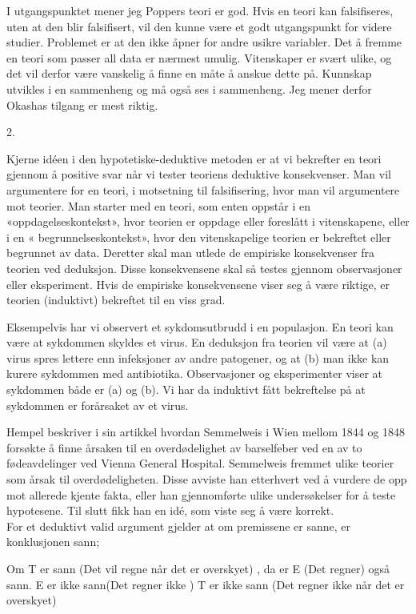 \documentclass[
  letterpaper,
  DIV=11,
  numbers=noendperiod]{scrreprt}
\begin{document}
I utgangspunktet mener jeg Poppers teori er god. Hvis en teori kan
falsifiseres, uten at den blir falsifisert, vil den kunne være et godt
utgangspunkt for videre studier. Problemet er at den ikke åpner for
andre usikre variabler. Det å fremme en teori som passer all data er
nærmest umulig. Vitenskaper er svært ulike, og det vil derfor være
vanskelig å finne en måte å anskue dette på. Kunnskap utvikles i en
sammenheng og må også ses i sammenheng. Jeg mener derfor Okashas tilgang
er mest riktig.

2.

Kjerne idéen i den hypotetiske-deduktive metoden er at vi bekrefter en
teori gjennom å positive svar når vi tester teoriens deduktive
konsekvenser. Man vil argumentere for en teori, i motsetning til
falsifisering, hvor man vil argumentere mot teorier. Man starter med en
teori, som enten oppstår i en «oppdagelseskontekst», hvor teorien er
oppdage eller foreslått i vitenskapene, eller i en «
begrunnelseskontekst», hvor den vitenskapelige teorien er bekreftet
eller begrunnet av data. Deretter skal man utlede de empiriske
konsekvenser fra teorien ved deduksjon. Disse konsekvensene skal så
testes gjennom observasjoner eller eksperiment. Hvis de empiriske
konsekvensene viser seg å være riktige, er teorien (induktivt) bekreftet
til en viss grad.

Eksempelvis har vi observert et sykdomsutbrudd i en populasjon. En teori
kan være at sykdommen skyldes et virus. En deduksjon fra teorien vil
være at (a) virus spres lettere enn infeksjoner av andre patogener, og
at (b) man ikke kan kurere sykdommen med antibiotika. Observasjoner og
eksperimenter viser at sykdommen både er (a) og (b). Vi har da induktivt
fått bekreftelse på at sykdommen er forårsaket av et virus.

Hempel beskriver i sin artikkel hvordan Semmelweis i Wien mellom 1844 og
1848 forsøkte å finne årsaken til en overdødelighet av barselfeber ved
en av to fødeavdelinger ved Vienna General Hospital. Semmelweis fremmet
ulike teorier som årsak til overdødeligheten. Disse avviste han
etterhvert ved å vurdere de opp mot allerede kjente fakta, eller han
gjennomførte ulike undersøkelser for å teste hypotesene. Til slutt fikk
han en idé, som viste seg å være korrekt.\\

For et deduktivt valid argument gjelder at om premissene er sanne, er
konklusjonen sann;

Om T er sann (Det vil regne når det er overskyet) , da er E (Det regner)
også sann. E er ikke sann(Det regner ikke ) T er ikke sann (Det regner
ikke når det er overskyet)
\end{document}
